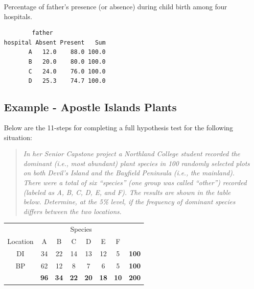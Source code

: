 \documentclass[10pt,openany]{book}\usepackage[]{graphicx}\usepackage[]{color}
\makeatletter
\newenvironment{kframe}{%
 \def\at@end@of@kframe{}%
 \ifinner\ifhmode%
  \def\at@end@of@kframe{\end{minipage}}%
  \begin{minipage}{\columnwidth}%
 \fi\fi%
 \def\FrameCommand##1{\hskip\@totalleftmargin \hskip-\fboxsep
 \colorbox{shadecolor}{##1}\hskip-\fboxsep
     \hskip-\linewidth \hskip-\@totalleftmargin \hskip\columnwidth}%
 \MakeFramed {\advance\hsize-\width
   \@totalleftmargin\z@ \linewidth\hsize
   \@setminipage}}%
 {\par\unskip\endMakeFramed%
 \at@end@of@kframe}
\newenvironment{knitrout}{}{} %
\makeatother
\begin{document}
\begin{table}[h]
  \caption{Percentage of father's presence (or absence) during child birth among four hospitals.}
  \label{tab:ChiFProw}
  \vspace{-12pt}
\begin{knitrout}
\color{fgcolor}\begin{kframe}
\begin{verbatim}
        father
hospital Absent Present   Sum
       A   12.0    88.0 100.0
       B   20.0    80.0 100.0
       C   24.0    76.0 100.0
       D   25.3    74.7 100.0
\end{verbatim}
\end{kframe}
\end{knitrout}
\end{table}





\subsection{Example - Apostle Islands Plants}
Below are the 11-steps  for completing a full hypothesis test for the following situation:
\vspace{-4pt}
\begin{quote}
\textsl{In her Senior Capstone project a Northland College student recorded the dominant (i.e., most abundant) plant species in 100 randomly selected plots on both Devil's Island and the Bayfield Peninsula (i.e., the mainland). There were a total of six ``species'' (one group was called ``other'') recorded (labeled as A, B, C, D, E, and F). The results are shown in the table below. Determine, at the 5\% level, if the frequency of dominant species differs between the two locations.}
\end{quote}

\begin{center}
  \begin{tabular}{c|c|c|c|c|c|c|c|}
    \multicolumn{1}{c}{} & \multicolumn{6}{c}{Species} & \multicolumn{1}{c}{} \\
    \cline{2-7}
    Location & A & B & C & D & E & F & \multicolumn{1}{c}{} \\
    \hline
    \multicolumn{1}{|c|}{DI} & 34 & 22 & 14 & 13 & 12 & 5 & \textbf{100} \\
    \hline
    \multicolumn{1}{|c|}{BP} & 62 & 12 & 8 & 7 & 6 & 5 & \textbf{100} \\
    \hline
    & \textbf{96} & \textbf{34} & \textbf{22} & \textbf{20} & \textbf{18} & \textbf{10} & \textbf{200} \\
    \cline{2-8}
  \end{tabular}
\end{center}
\end{document}
